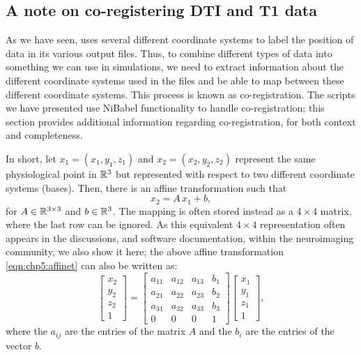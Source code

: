 \subsection{A note on co-registering DTI and T1 data}
\label{sec:chp-dti:freesurfer-coord}
As we have seen, {\freesurfer} uses several different coordinate
systems to label the position of data in its various output files.
Thus, to combine different types of data into something we can use in
{\fenics} simulations, we need to extract information about the
different coordinate systems used in the files and be able to map
between these different coordinate systems. This process is known as
co-registration. The scripts we have presented use NiBabel
functionality to handle co-registration; this section provides 
additional information regarding co-registration, for both context and
completeness.

In short, let $x_1 = (x_1, y_1, z_1)$ and $x_2 = (x_2, y_2, z_2)$ represent the
same physiological point in $\mathbb{R}^3$ but represented with respect to two
different coordinate systems (bases). Then, there is an affine
transformation such that
\begin{equation}\label{eqn:chp5:affinet}
x_2 = A\, x_1 + b,
\end{equation}
for $A \in \mathbb{R}^{3 \times 3}$ and $b \in \mathbb{R}^3$. The mapping is often
stored instead as a $4\times4$ matrix, where the last row can be
ignored. As this equivalent $4\times 4$ representation often appears in the 
discussions, and software documentation, within the neuroimaging community, 
we also show it here; the above affine transformation \eqref{eqn:chp5:affinet} 
can also be written as:
\begin{equation*}
\left[\begin{array}{c}
x_{2}\\
y_{2}\\
z_{2}\\
1
\end{array}\right] = 
\left[
\begin{array}{cccc}
a_{11} & a_{12} & a_{13} & b_1 \\
a_{21} & a_{22} & a_{23} & b_2 \\
a_{31} & a_{32} & a_{33} & b_3 \\
0      &    0   &   0    & 1
\end{array}
\right]
\left[
\begin{array}{c}
x_1\\
y_1\\
z_1\\
1
\end{array}
\right],
\end{equation*}
where the $a_{ij}$ are the entries of the matrix $A$ and the $b_i$ are the 
entries of the vector $b$. 



